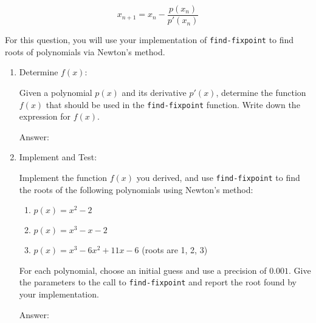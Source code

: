 \documentclass[12pt,letterpaper]{ntdhw}
\begin{document}
\begin{enumerate}
    \[
    x_{n+1} = x_n - \frac{p(x_n)}{p'(x_n)}
    \]

    For this question, you will use your implementation of {\tt find-fixpoint} to find roots of polynomials via Newton's method.
  \begin{enumerate}
    \item Determine \( f(x) \):

    Given a polynomial \( p(x) \) and its derivative \( p'(x) \), determine the function \( f(x) \) that should be used in the {\tt find-fixpoint} function. Write down the expression for \( f(x) \).

    \begin{emph}
      Answer: %
    \end{emph}

    \item Implement and Test:

    Implement the function \( f(x) \) you derived, and use {\tt find-fixpoint} to find the roots of the following polynomials using Newton's method:
    \begin{enumerate}
      \item \( p(x) = x^2 - 2 \)
      \item \( p(x) = x^3 - x - 2 \)
      \item \( p(x) = x^3 - 6x^2 + 11x - 6 \) (roots are 1, 2, 3)
    \end{enumerate}

    For each polynomial, choose an initial guess and use a precision of \( 0.001 \). Give the parameters to the call to {\tt find-fixpoint} and report the root found by your implementation.

    \begin{emph}
      Answer: %
    \end{emph}

  \end{enumerate}

\end{enumerate}
\end{document}
